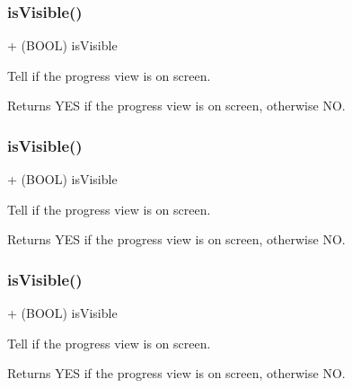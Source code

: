\subsubsection{\texorpdfstring{is\+Visible()}{isVisible()}\hspace{0.1cm}{\footnotesize\ttfamily [1/3]}}
{\footnotesize\ttfamily + (B\+O\+OL) is\+Visible \begin{DoxyParamCaption}{ }\end{DoxyParamCaption}}

Tell if the progress view is on screen. \begin{DoxyReturn}{Returns}
Y\+ES if the progress view is on screen, otherwise NO. 
\end{DoxyReturn}
\mbox{\label{interface_k_v_n_progress_a28dddb521ec06e907b8cc436b34e71cb}} 
\subsubsection{\texorpdfstring{is\+Visible()}{isVisible()}\hspace{0.1cm}{\footnotesize\ttfamily [2/3]}}
{\footnotesize\ttfamily + (B\+O\+OL) is\+Visible \begin{DoxyParamCaption}{ }\end{DoxyParamCaption}}

Tell if the progress view is on screen. \begin{DoxyReturn}{Returns}
Y\+ES if the progress view is on screen, otherwise NO. 
\end{DoxyReturn}
\mbox{\label{interface_k_v_n_progress_a28dddb521ec06e907b8cc436b34e71cb}} 
\subsubsection{\texorpdfstring{is\+Visible()}{isVisible()}\hspace{0.1cm}{\footnotesize\ttfamily [3/3]}}
{\footnotesize\ttfamily + (B\+O\+OL) is\+Visible \begin{DoxyParamCaption}{ }\end{DoxyParamCaption}}

Tell if the progress view is on screen. \begin{DoxyReturn}{Returns}
Y\+ES if the progress view is on screen, otherwise NO. 
\end{DoxyReturn}
\mbox{\label{interface_k_v_n_progress_ab00ed30bcc9ef7e6517f27554d570bf9}} 
